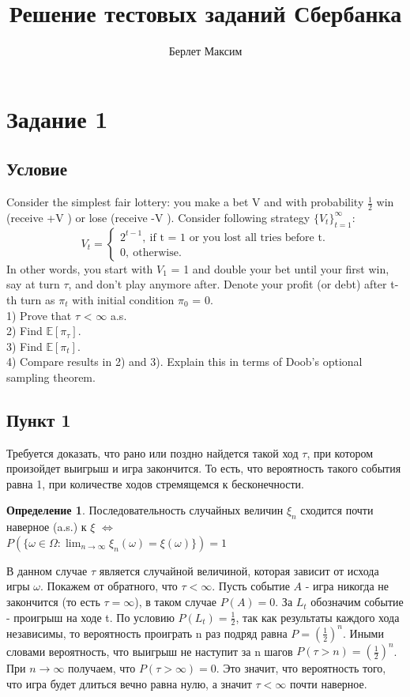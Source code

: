 \documentclass[a4paper]{article}
\title{Решение тестовых заданий Сбербанка}
\author{Берлет Максим}
\date{}
\theoremstyle{definition}
\newtheorem{definition}{Определение}[section]
\begin{document}
\maketitle
\pagebreak

\tableofcontents
\pagebreak

\section{Задание 1}
\subsection{Условие}
Consider the simplest fair lottery: you make a bet V and with probability $\frac{1}{2}$ win (receive +V ) or lose (receive -V ). 
Consider following strategy $\{V_t\}_{t=1}^{\infty}$:
\[ 
V_t = \begin{cases}
    2^{t-1}, \ \text{if t = 1 or you lost all tries before t.} \\
    0, \ \text{otherwise.}
    \end{cases}
\]
In other words, you start with $V_1$ = 1 and double your bet until your first win, say at turn $\tau$, and don’t play
anymore after. Denote your profit (or debt) after t-th turn as $\pi_t$ with initial condition $\pi_0$ = 0. \\
1) Prove that $\tau$ < $\infty$ a.s.\\
2) Find $\mathbb{E}[\pi_{\tau}]$. \\
3) Find $\mathbb{E}[\pi_t]$. \\
4) Compare results in 2) and 3). Explain this in terms of Doob’s optional sampling theorem.

\subsection{Пункт 1}
    Требуется доказать, что рано или поздно найдется такой ход $\tau$, при котором произойдет выигрыш и игра закончится. 
    То есть, что вероятность такого события равна 1, при количестве ходов стремящемся к бесконечности.

    \begin{definition}
        Последовательность случайных величин $\xi_n$ сходится почти наверное (a.s.) к $\xi$ $\Leftrightarrow$ \\
        $P(\{\omega \in \Omega: \lim_{n \rightarrow \infty} \xi_n(\omega) = \xi(\omega) \}) = 1$  
    \end{definition}

    В данном случае $\tau$ является случайной величиной, которая зависит от исхода игры $\omega$. Покажем от обратного, что $\tau < \infty$.
    Пусть событие $A$ - игра никогда не закончится (то есть $\tau = \infty$), в таком случае $P(A) = 0$. За $L_t$ обозначим событие - проигрыш на ходе t.
    По условию $P(L_t) = \frac{1}{2}$, так как результаты каждого хода независимы, то вероятность проиграть n раз подряд равна $P = (\frac{1}{2})^n$. Иными словами
    вероятность, что выигрыш не наступит за n шагов $P(\tau > n) = (\frac{1}{2})^n$. При $n \rightarrow \infty$ получаем, что $P(\tau > \infty) = 0$. 
    Это значит, что вероятность того, что игра будет длиться вечно равна нулю, а значит $\tau < \infty$ почти наверное.     
\end{document}
